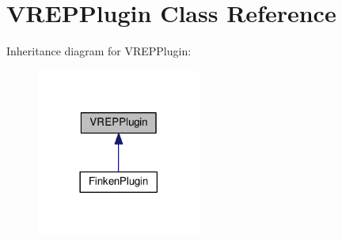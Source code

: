 \hypertarget{classVREPPlugin}{}\section{V\+R\+E\+P\+Plugin Class Reference}
\label{classVREPPlugin}


Inheritance diagram for V\+R\+E\+P\+Plugin\+:\nopagebreak
\begin{figure}[H]
\begin{center}
\leavevmode
\includegraphics[width=153pt]{classVREPPlugin__inherit__graph}
\end{center}
\end{figure}
